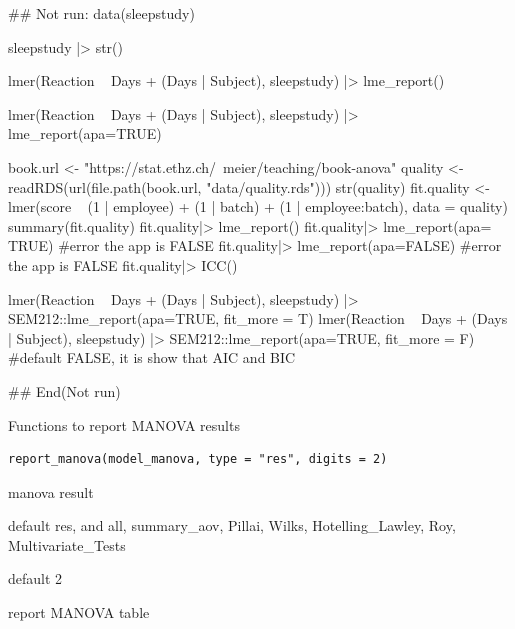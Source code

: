 \documentclass[a4paper]{book}
\begin{document}
%
\begin{Examples}
\begin{ExampleCode}
\#\# Not run: 
data(sleepstudy)

sleepstudy |> str()

lmer(Reaction ~ Days + (Days | Subject), sleepstudy) |> lme_report()

lmer(Reaction ~ Days + (Days | Subject), sleepstudy) |> lme_report(apa=TRUE)


book.url <- "https://stat.ethz.ch/~meier/teaching/book-anova"
quality <- readRDS(url(file.path(book.url, "data/quality.rds")))
str(quality)
fit.quality <- lmer(score ~ (1 | employee) + (1 | batch) +
                     (1 | employee:batch), data = quality)
summary(fit.quality)
fit.quality|> lme_report()
fit.quality|> lme_report(apa= TRUE) #error the app is FALSE
fit.quality|> lme_report(apa=FALSE) #error the app is FALSE
fit.quality|> ICC()

lmer(Reaction ~ Days + (Days | Subject), sleepstudy) |>
SEM212::lme_report(apa=TRUE, fit_more = T)
lmer(Reaction ~ Days + (Days | Subject), sleepstudy) |>
SEM212::lme_report(apa=TRUE, fit_more = F)  #default FALSE, it is show that AIC and BIC


## End(Not run)

\end{ExampleCode}
\end{Examples}
%
\begin{Description}
Functions to report MANOVA results
\end{Description}
%
\begin{Usage}
\begin{verbatim}
report_manova(model_manova, type = "res", digits = 2)
\end{verbatim}
\end{Usage}
%
\begin{Arguments}
\begin{ldescription}
\item[\code{model\_manova}] manova result

\item[\code{type}] default res, and all, summary\_aov, Pillai, Wilks, Hotelling\_Lawley, Roy, Multivariate\_Tests

\item[\code{digits}] default 2
\end{ldescription}
\end{Arguments}
%
\begin{Value}
report MANOVA table
\end{Value}
\end{document}
